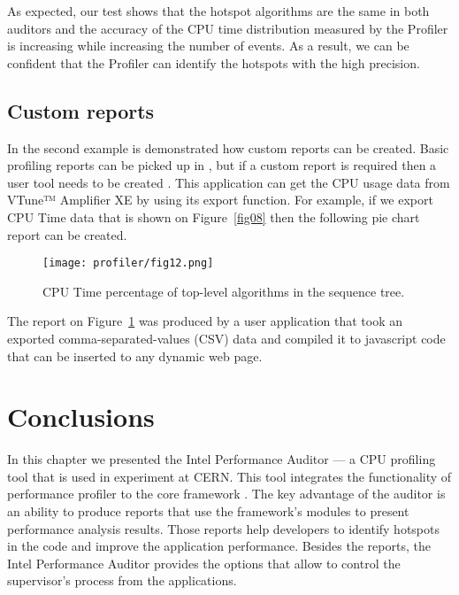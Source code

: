 As expected, our test shows that the hotspot algorithms are the same in both
auditors and the accuracy of the CPU time distribution measured by the Profiler
is increasing while increasing the number of events. As a result, we can be
confident that the Profiler can identify the hotspots with the high precision.

\subsection{Custom reports}

In the second example is demonstrated how custom reports can be created. Basic
profiling reports can be picked up in
\amp, but if a custom report is required then a user tool needs to be created .
This application can get the CPU usage data from VTune™ Amplifier XE by using
its export function. For example, if we export CPU Time data that is shown on
Figure~\ref{fig08} then the following pie chart report can be created.

\begin{figure}[H]
\begin{minipage}{\textwidth}
\begin{center}
\texttt{[image: profiler/fig12.png]}
\caption{\label{fig12}CPU Time percentage of top-level algorithms in the \gaudi sequence tree.}
\end{center}
\end{minipage}
\end{figure}

The report on Figure~\ref{fig12} was produced by a user application that took
an exported  comma-separated-values (CSV) data and compiled it to javascript
code that can be inserted to any dynamic web page.

\section{Conclusions}
In this chapter we presented the \gaudi Intel Performance Auditor --- a CPU
profiling tool that is used in \lhcb experiment at CERN. This tool integrates
the functionality of \iamp performance profiler to the \lhcb core framework
\gaudi. The key advantage of the auditor is an ability to produce reports that
use the framework's modules to present performance analysis results. Those
reports help  developers to identify hotspots in the code and improve the
application performance. Besides the reports, the \gaudi Intel Performance
Auditor provides the options that allow to control the \iamp supervisor’s
process from the \gaudi applications.

